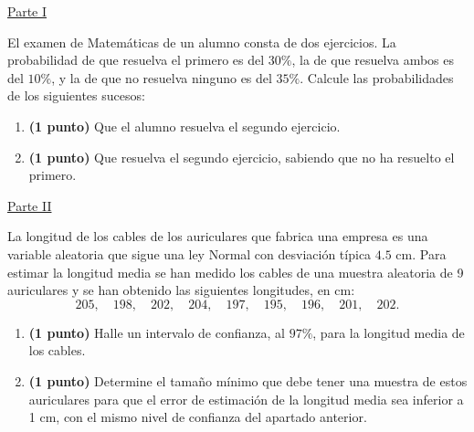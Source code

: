 
\noindent\underline{Parte I}

El examen de Matemáticas de un alumno consta de dos ejercicios. La probabilidad de que resuelva el primero es del $30\%$, la de que resuelva ambos es del $10\%$, y la de que no resuelva ninguno es del $35\%$. Calcule las probabilidades de los siguientes sucesos:
\begin{enumerate}[label=\alph*)]
\item \textbf{(1 punto)} Que el alumno resuelva el segundo ejercicio.
\item \textbf{(1 punto)} Que resuelva el segundo ejercicio, sabiendo que no ha resuelto el primero.
\end{enumerate}
\par\noindent\begin{minipage}{\linewidth}
\noindent\underline{Parte II}

La longitud de los cables de los auriculares que fabrica una empresa es una variable aleatoria que sigue una ley Normal con desviación típica $4.5$ cm. Para estimar la longitud media se han medido los cables de una muestra aleatoria de 9 auriculares y se han obtenido las siguientes longitudes, en cm:
\[
205,\quad198,\quad202,\quad204,\quad197,\quad195,\quad196,\quad201,\quad202.
\]
\begin{enumerate}[label=\alph*)]
\item \textbf{(1 punto)} Halle un intervalo de confianza, al $97\%$, para la longitud media de los cables.
\item \textbf{(1 punto)} Determine el tamaño mínimo que debe tener una muestra de estos auriculares para que el error de estimación de la longitud media sea inferior a 1 cm, con el mismo nivel de confianza del apartado anterior.
\end{enumerate}
\end{minipage}\par
